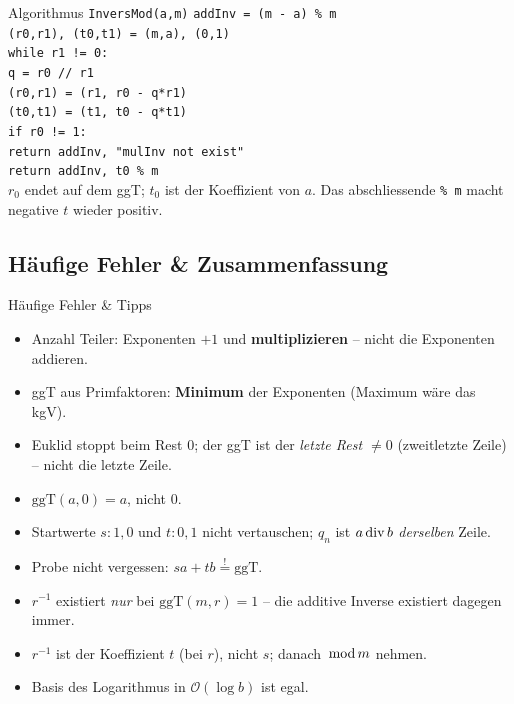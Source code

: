\documentclass[a4paper, fontsize=7pt]{scrartcl}
\def\oof{\mathcal{O}}
\newcommand{\Div}{\mskip3mu\mathrm{div}\mskip3mu}
\newcommand{\Mod}{\mskip3mu\mathrm{mod}\mskip3mu}
\begin{document}
\begin{subbox}{Algorithmus \texttt{InversMod(a,m)}}
\texttt{addInv = (m - a) \% m}\\
\texttt{(r0,r1), (t0,t1) = (m,a), (0,1)}\\
\texttt{while r1 != 0:}\\
\phantom{xx}\texttt{q = r0 // r1}\\
\phantom{xx}\texttt{(r0,r1) = (r1, r0 - q*r1)}\\
\phantom{xx}\texttt{(t0,t1) = (t1, t0 - q*t1)}\\
\texttt{if r0 != 1:}\\
\phantom{xx}\texttt{return addInv, "mulInv not exist"}\\
\texttt{return addInv, t0 \% m}\\[2pt]
$r_0$ endet auf dem ggT; $t_0$ ist der Koeffizient von $a$. Das
abschliessende \texttt{\% m} macht negative $t$ wieder positiv.
\end{subbox}

\subsection{Häufige Fehler \& Zusammenfassung}

\begin{subbox}{Häufige Fehler \& Tipps}
\begin{itemize}
    \item Anzahl Teiler: Exponenten \textbf{$+1$} und
          \textbf{multiplizieren} -- nicht die Exponenten addieren.
    \item ggT aus Primfaktoren: \textbf{Minimum} der Exponenten
          (Maximum wäre das kgV).
    \item Euklid stoppt beim Rest $0$; der ggT ist der \emph{letzte Rest
          $\neq 0$} (zweitletzte Zeile) -- nicht die letzte Zeile.
    \item $\mathrm{ggT}(a,0) = a$, nicht $0$.
    \item Startwerte $s: 1,0$ und $t: 0,1$ nicht vertauschen; $q_n$ ist
          $a \Div b$ \emph{derselben} Zeile.
    \item Probe nicht vergessen: $s a + t b \overset{!}{=} \mathrm{ggT}$.
    \item $r^{-1}$ existiert \emph{nur} bei $\mathrm{ggT}(m,r)=1$ -- die
          additive Inverse existiert dagegen immer.
    \item $r^{-1}$ ist der Koeffizient $t$ (bei $r$), nicht $s$; danach
          $\Mod m$ nehmen.
    \item Basis des Logarithmus in $\oof(\log b)$ ist egal.
\end{itemize}
\end{subbox}
\end{document}
